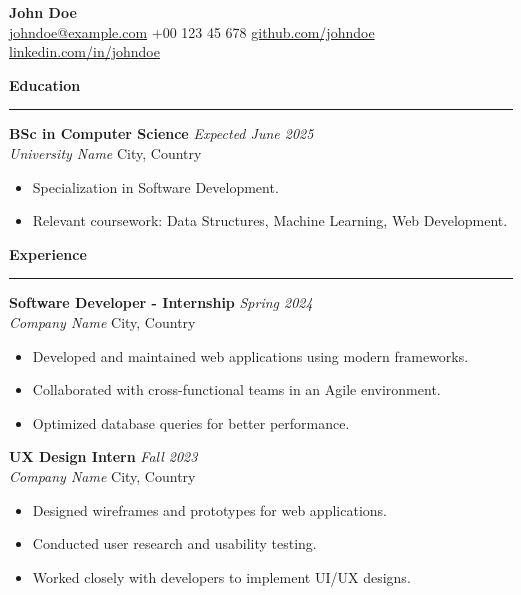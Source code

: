 \documentclass[10pt]{article}
\newcommand{\cvsection}[1]{
    \vspace{0.1cm}
    \noindent
    \textbf{\large #1}
    \vspace{0.1cm}
    \hrule
    \vspace{0.2cm}
}
\newcommand{\cvitem}[4]{
    \noindent
    \textbf{#1} \hfill \textit{#2} \\
    \textit{#3} \hfill #4
}
\begin{document}
\begin{center}
    \textbf{\Huge John Doe} \\
    \vspace{0.3cm}
    \faEnvelope \hspace{0.1cm} \href{mailto:johndoe@example.com}{johndoe@example.com} \hspace{0.5cm}
    \faPhone \hspace{0.1cm} +00 123 45 678 \hspace{0.5cm}
    \faGithub \hspace{0.1cm} \href{https://github.com/johndoe}{github.com/johndoe} \hspace{0.5cm}
    \faLinkedin \hspace{0.1cm} \href{https://linkedin.com/in/johndoe}{linkedin.com/in/johndoe} 
\end{center}

\cvsection{Education}
\cvitem{BSc in Computer Science}{Expected June 2025}{University Name}{City, Country}
\begin{itemize}[leftmargin=*, nosep]
    \item Specialization in Software Development.
    \item Relevant coursework: Data Structures, Machine Learning, Web Development.
\end{itemize}

\cvsection{Experience}
\cvitem{Software Developer - Internship}{Spring 2024}{Company Name}{City, Country}
\begin{itemize}[leftmargin=*, nosep]
    \item Developed and maintained web applications using modern frameworks.
    \item Collaborated with cross-functional teams in an Agile environment.
    \item Optimized database queries for better performance.
\end{itemize}

\cvitem{UX Design Intern}{Fall 2023}{Company Name}{City, Country}
\begin{itemize}[leftmargin=*, nosep]
    \item Designed wireframes and prototypes for web applications.
    \item Conducted user research and usability testing.
    \item Worked closely with developers to implement UI/UX designs.
\end{itemize}
\end{document}
